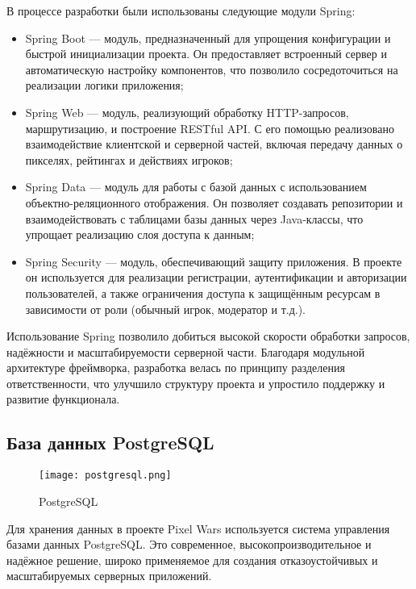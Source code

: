 В процессе разработки были использованы следующие модули Spring:
\begin{itemize}
    \item Spring Boot --- модуль, предназначенный для упрощения конфигурации и быстрой инициализации проекта. Он предоставляет встроенный сервер и автоматическую настройку компонентов, что позволило сосредоточиться на реализации логики приложения;

    \item Spring Web --- модуль, реализующий обработку HTTP-запросов, маршрутизацию, и построение RESTful API. С его помощью реализовано взаимодействие клиентской и серверной частей, включая передачу данных о пикселях, рейтингах и действиях игроков;

    \item Spring Data --- модуль для работы с базой данных с использованием объектно-реляционного отображения. Он позволяет создавать репозитории и взаимодействовать с таблицами базы данных через Java-классы, что упрощает реализацию слоя доступа к данным;

    \item Spring Security --- модуль, обеспечивающий защиту приложения. В проекте он используется для реализации регистрации, аутентификации и авторизации пользователей, а также ограничения доступа к защищённым ресурсам в зависимости от роли (обычный игрок, модератор и т.д.).
\end{itemize}

Использование Spring позволило добиться высокой скорости обработки запросов, надёжности и масштабируемости серверной части. Благодаря модульной архитектуре фреймворка, разработка велась по принципу разделения ответственности, что улучшило структуру проекта и упростило поддержку и развитие функционала. \cite{spring}

\subsection{База данных PostgreSQL}

\begin{figure}[H]
    \centering
    \texttt{[image: postgresql.png]}
    \caption{PostgreSQL}
\end{figure}

Для хранения данных в проекте Pixel Wars используется система управления базами данных PostgreSQL. Это современное, высокопроизводительное и надёжное решение, широко применяемое для создания отказоустойчивых и масштабируемых серверных приложений.

